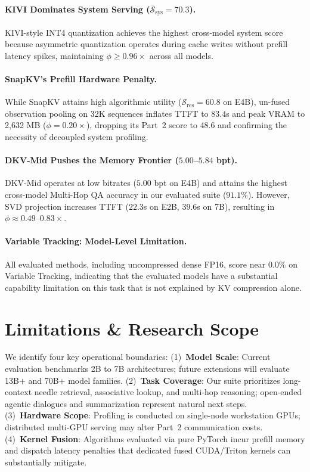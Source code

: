 \documentclass[10pt]{article}
\theoremstyle{definition}
\begin{document}
\paragraph{KIVI Dominates System Serving ($\bar{\mathcal{S}}_{\text{sys}} = 70.3$).}
KIVI-style INT4 quantization achieves the highest cross-model system score because asymmetric quantization operates during cache writes without prefill latency spikes, maintaining $\phi \ge 0.96\times$ across all models.

\paragraph{SnapKV's Prefill Hardware Penalty.}
While SnapKV attains high algorithmic utility ($\mathcal{S}_{\text{res}} = 60.8$ on E4B), un-fused observation pooling on 32K sequences inflates TTFT to $83.4$s and peak VRAM to 2,632 MB ($\phi = 0.20\times$), dropping its Part~2 score to $48.6$ and confirming the necessity of decoupled system profiling.

\paragraph{DKV-Mid Pushes the Memory Frontier ($5.00$--$5.84$ bpt).}
DKV-Mid operates at low bitrates ($5.00$ bpt on E4B) and attains the highest cross-model Multi-Hop QA accuracy in our evaluated suite ($91.1\%$). However, SVD projection increases TTFT ($22.3$s on E2B, $39.6$s on 7B), resulting in $\phi \approx 0.49$--$0.83\times$.

\paragraph{Variable Tracking: Model-Level Limitation.} All evaluated methods, including uncompressed dense FP16, score near $0.0\%$ on Variable Tracking, indicating that the evaluated models have a substantial capability limitation on this task that is not explained by KV compression alone.

\section{Limitations \& Research Scope}
\label{sec:limitations}
We identify four key operational boundaries: (1)~\textbf{Model Scale}: Current evaluation benchmarks 2B to 7B architectures; future extensions will evaluate 13B+ and 70B+ model families. (2)~\textbf{Task Coverage}: Our suite prioritizes long-context needle retrieval, associative lookup, and multi-hop reasoning; open-ended agentic dialogues and summarization represent natural next steps. (3)~\textbf{Hardware Scope}: Profiling is conducted on single-node workstation GPUs; distributed multi-GPU serving may alter Part~2 communication costs. (4)~\textbf{Kernel Fusion}: Algorithms evaluated via pure PyTorch incur prefill memory and dispatch latency penalties that dedicated fused CUDA/Triton kernels can substantially mitigate.
\end{document}
